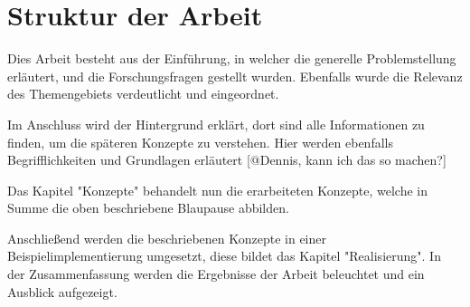 \section{Struktur der Arbeit}

Dies Arbeit besteht aus der Einführung, in welcher die generelle Problemstellung erläutert, und die Forschungsfragen gestellt wurden. Ebenfalls wurde die Relevanz des Themengebiets verdeutlicht und eingeordnet.

Im Anschluss wird der Hintergrund erklärt, dort sind alle Informationen zu finden, um die späteren Konzepte zu verstehen. Hier werden ebenfalls Begrifflichkeiten und Grundlagen erläutert [@Dennis, kann ich das so machen?]

Das Kapitel "Konzepte" behandelt nun die erarbeiteten Konzepte, welche in Summe die oben beschriebene Blaupause abbilden. 
 
Anschließend werden die beschriebenen Konzepte in einer Beispielimplementierung umgesetzt, diese bildet das Kapitel "Realisierung". In der Zusammenfassung werden die Ergebnisse der Arbeit beleuchtet und ein Ausblick aufgezeigt.
